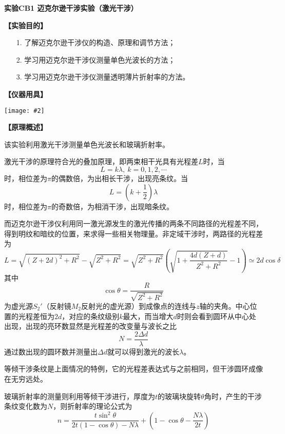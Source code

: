 \documentclass[11pt,a4paper]{ctexart}
\newcommand{\ExpeName}{实验CB1 迈克尔逊干涉实验（激光干涉）}
\newcommand{\cpic}[2]{
\begin{center}
\texttt{[image: \#2]}
\end{center}
}
\newcommand{\beq}{\begin{equation}}
\newcommand{\eeq}{\end{equation}}
\begin{document}
\newpage%
\begin{center}
\LARGE{\textbf{\ExpeName}}
\end{center}
\textbf{【实验目的】}
\begin{enumerate}
 \item[1.] 了解迈克尔逊干涉仪的构造、原理和调节方法；
 \item[2.] 学习用迈克尔逊干涉仪测量单色光波长的方法；
 \item[3.] 学习用迈克尔逊干涉仪测量透明薄片折射率的方法。
\end{enumerate}
\textbf{【仪器用具】}
\cpic{0.3}{t1}
\textbf{【原理概述】}\par
该实验利用激光干涉测量单色光波长和玻璃折射率。
\par
激光干涉的原理符合光的叠加原理，即两束相干光具有光程差$L$时，当
\beq
L = k\lambda,\ k = 0,1,2,\cdots
\eeq
时，相位差为$\pi$的偶数倍，为出相长干涉，出现亮条纹。当
\beq
L = (k + \frac{1}{2})\lambda
\eeq
时，相位差为$\pi$的奇数倍，为相消干涉，出现暗条纹。\par
而迈克尔逊干涉仪利用同一激光源发生的激光传播的两条不同路径的光程差不同，得到明纹和暗纹的位置，来求得一些相关物理量。非定域干涉时，两路径的光程差为
\beq
L = \sqrt{(Z+2d)^2 + R^2} - \sqrt{Z^2 + R^2} = \sqrt{Z^2 + R^2}(\sqrt{1+\frac{4d(Z+d)}{Z^2 + R^2}} - 1) \simeq 2d\cos \delta
\eeq
其中
\beq
\cos \theta = \frac{R}{\sqrt{Z^2 + R^2}}
\eeq
为虚光源$S_2'$（反射镜$M_2$反射光的虚光源）到成像点的连线与$z$轴的夹角。中心位置的光程差恒为$2d$，对应的条纹级别$k$最大，而当增大$d$时则会看到圆环从中心处出现，出现的亮环数显然是光程差的改变量与波长之比
\beq
N = \frac{2\Delta d}{\lambda}
\eeq
通过数出现的圆环数并测量出$\Delta d$就可以得到激光的波长$\lambda$。
\par
等倾干涉条纹是上面情况的特例，它的光程差表达式与之前相同，但干涉圆环成像在无穷远处。
\par
玻璃折射率的测量则利用等倾干涉进行，厚度为$t$的玻璃块旋转$\theta$角时，产生的干涉条纹变化数为$N$，则折射率的理论公式为
\beq
n = \frac{t \sin^2 \theta}{2t(1-\cos \theta) - N \lambda} + (1-\cos \theta - \frac{N\lambda}{2t})
\eeq
\end{document}
